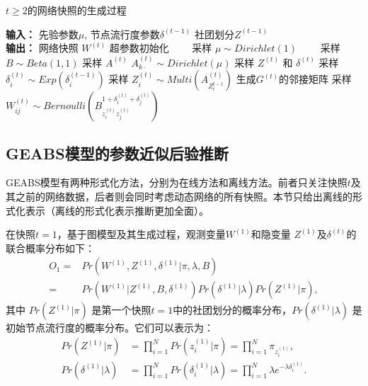 \begin{algorithm}[H]
\caption{$t \ge 2$的网络快照的生成过程}\label{gent2}
\begin{algorithmic}[1]
\STATE \textbf{输入：} 先验参数$\mu$, 节点流行度参数$\delta^{(t-1)}$ 社团划分$Z^{(t-1)}$ \\
\STATE \textbf{输出：} 网络快照 $W^{(t)}$
\STATE 超参数初始化
\STATE ~~~~采样 $\mu \sim Dirichlet (1)$ 
\STATE ~~~~采样 $B \sim Beta(1,1)$
\STATE 采样 $A^{(t)}$
\STATE $A^{(t)}_{k\cdot} \sim Dirichlet(\mu)$
\ENDFOR
\STATE 采样 $Z^{(t)}$ 和 $\delta^{(t)}$
\STATE 采样 $\delta^{(t)}_i \sim Exp(\delta^{(t-1)}_i)$
\STATE 采样 $Z^{(t)}_i \sim Multi(A^{(t)}_{Z_i^{t-1}})$
\ENDFOR
\STATE 生成$G^{(t)}的邻接矩阵$
\STATE 采样 $W^{(t)}_{ij} \sim Bernoulli(B_{z_i^{(t)} z_j^{(t)}}^{1+\delta_i^{(t)} + \delta_j^{(t)}})$
\ENDFOR
\end{algorithmic}
\end{algorithm}

\subsection{GEABS模型的参数近似后验推断}



GEABS模型有两种形式化方法，分别为在线方法和离线方法。前者只关注快照$t$及其之前的网络数据，后者则会同时考虑动态网络的所有快照。本节只给出离线的形式化表示（离线的形式化表示推断更加全面）。

在快照$t=1$，基于图模型及其生成过程，观测变量$W^{(1)}$和隐变量 $Z^{(1)}$及$\delta^{(t)}$的联合概率分布如下：
\begin{align}
O_1 = & Pr(W^{(1)}, Z^{(1)}, \delta^{(1)} |\pi, \lambda, B) \nonumber\\
= & Pr(W^{(1)}|Z^{(1)},B,\delta^{(1)})  Pr(\delta^{(1)}|\lambda) Pr(Z^{(1)}|\pi),
\label{eq:O1}
\end{align}
其中 $Pr(Z^{(1)} | \pi)$ 是第一个快照$t=1$中的社团划分的概率分布，$Pr(\delta^{(1)} | \lambda)$ 是初始节点流行度的概率分布。它们可以表示为：
\begin{align}
Pr (Z^{(1)}|\pi) &= \prod_{i=1}^{N} Pr(z_i^{(1)}|\pi) = \prod_{i=1}^{N} \pi_{z_i^{(1)}}, 
\label{eq:O6}\\
Pr (\delta^{(1)}|\lambda)  &= \prod_{i=1}^{N} Pr(\delta_i^{(1)}|\lambda)
 = \prod_{i=1}^{N} \lambda e^{-\lambda \delta_i^{(1)}}. 
\label{eq:O7}
\end{align}

